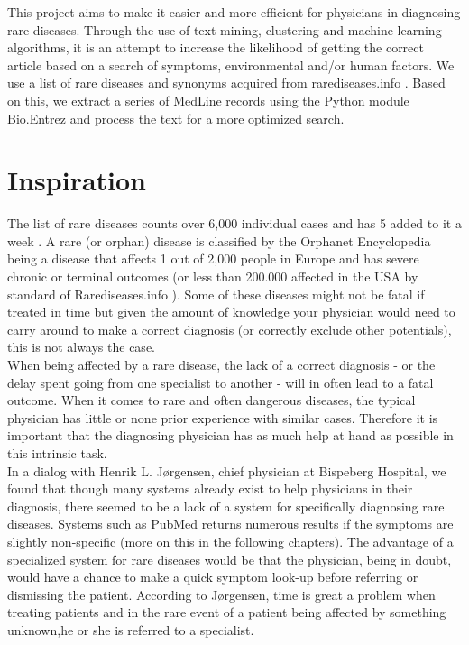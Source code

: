 This project aims to make it easier and more efficient for physicians
in diagnosing rare diseases. Through the use of text mining,
clustering and machine learning algorithms, it is an attempt to
increase the likelihood of getting the correct article based on a
search of symptoms, environmental and/or human factors. We use a list
of rare diseases and synonyms acquired from rarediseases.info
\cite{Rarediseases}. Based on this, we
extract a series of MedLine records \cite{PubMedFactSheetMedline}
using the Python module Bio.Entrez \cite{EntrezProgUtil} and process
the text for a more optimized search.

\section{Inspiration}

The list of rare diseases counts over 6,000 individual cases and has 5
added to it a week \cite{AboutRareDiseasesOrphanet}. A rare (or
orphan) disease is classified by the Orphanet Encyclopedia
\cite{OrphanetEncyclopedia} being a disease that affects 1 out of 2,000
people in Europe and has severe chronic or terminal outcomes (or less
than 200.000 affected in the USA by standard of
Rarediseases.info \cite{Rarediseases}). Some
of these diseases might not be fatal if treated in time but given the
amount of knowledge your physician would need to carry around to make
a correct diagnosis (or correctly exclude other potentials), this is
not always the case.\\

When being affected by a rare disease, the lack of a correct diagnosis
- or the delay spent going from one specialist to another - will in
often lead to a fatal outcome. When it comes to rare and often
dangerous diseases, the typical physician has little or none prior
experience with similar cases. Therefore it is important that the
diagnosing physician has as much help at hand as possible in this
intrinsic task.\\

In a dialog with Henrik L. Jørgensen, chief physician at Bispeberg
Hospital, we found that though many systems already exist to help
physicians in their diagnosis, there seemed to be a lack of a system
for specifically diagnosing rare diseases. Systems such as PubMed
returns numerous results if the symptoms are slightly non-specific
(more on this in the following chapters). The advantage of a
specialized system for rare diseases would be that the physician,
being in doubt, would have a chance to make a quick symptom look-up
before referring or dismissing the patient. According to Jørgensen,
time is great a problem when treating patients and in the rare event
of a patient being affected by something unknown,he or she is referred
to a specialist.\\

